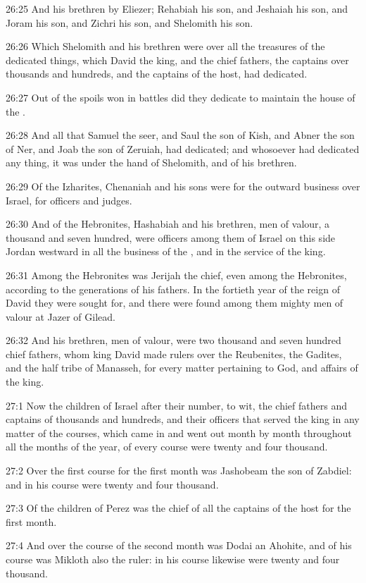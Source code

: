 26:25 And his brethren by Eliezer; Rehabiah his son, and Jeshaiah his
son, and Joram his son, and Zichri his son, and Shelomith his son.

26:26 Which Shelomith and his brethren were over all the treasures of
the dedicated things, which David the king, and the chief fathers, the
captains over thousands and hundreds, and the captains of the host,
had dedicated.

26:27 Out of the spoils won in battles did they dedicate to maintain
the house of the \LORD.

26:28 And all that Samuel the seer, and Saul the son of Kish, and
Abner the son of Ner, and Joab the son of Zeruiah, had dedicated; and
whosoever had dedicated any thing, it was under the hand of Shelomith,
and of his brethren.

26:29 Of the Izharites, Chenaniah and his sons were for the outward
business over Israel, for officers and judges.

26:30 And of the Hebronites, Hashabiah and his brethren, men of
valour, a thousand and seven hundred, were officers among them of
Israel on this side Jordan westward in all the business of the \LORD,
and in the service of the king.

26:31 Among the Hebronites was Jerijah the chief, even among the
Hebronites, according to the generations of his fathers. In the
fortieth year of the reign of David they were sought for, and there
were found among them mighty men of valour at Jazer of Gilead.

26:32 And his brethren, men of valour, were two thousand and seven
hundred chief fathers, whom king David made rulers over the
Reubenites, the Gadites, and the half tribe of Manasseh, for every
matter pertaining to God, and affairs of the king.

27:1 Now the children of Israel after their number, to wit, the chief
fathers and captains of thousands and hundreds, and their officers
that served the king in any matter of the courses, which came in and
went out month by month throughout all the months of the year, of
every course were twenty and four thousand.

27:2 Over the first course for the first month was Jashobeam the son
of Zabdiel: and in his course were twenty and four thousand.

27:3 Of the children of Perez was the chief of all the captains of the
host for the first month.

27:4 And over the course of the second month was Dodai an Ahohite, and
of his course was Mikloth also the ruler: in his course likewise were
twenty and four thousand.

